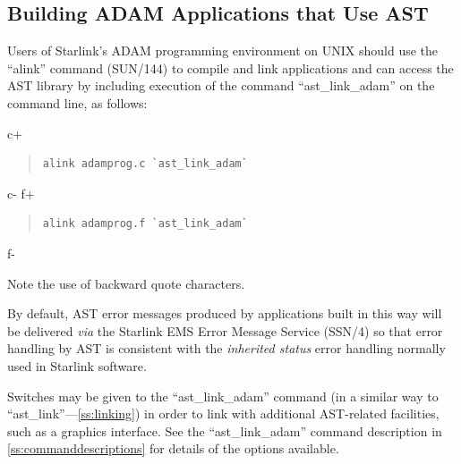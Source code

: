 \documentclass[twoside,11pt]{article}
\newcommand{\xref}[3]{#1}
\newcommand{\appref}[1]{Appendix~\ref{#1}}
\newcommand{\secref}[1]{\S\ref{#1}}
\renewcommand{\appref}[1]{\ref{#1}}
\renewcommand{\secref}[1]{\ref{#1}}
\begin{document}
\subsection{Building ADAM Applications that Use AST}

Users of Starlink's \xref{ADAM}{sg4}{} programming environment
 on UNIX should use the
``\xref{alink}{sun144}{ADAM_link_scripts}'' command
(\xref{SUN/144}{sun144}{}) to compile and link applications and can
access the AST library by including execution of the command
``ast\_link\_adam'' on the command line, as follows:

c+
\begin{quote}
\small
\begin{verbatim}
alink adamprog.c `ast_link_adam`
\end{verbatim}
\normalsize
\end{quote}
c-
f+
\begin{quote}
\small
\begin{verbatim}
alink adamprog.f `ast_link_adam`
\end{verbatim}
\normalsize
\end{quote}
f-

Note the use of backward quote characters.

By default, AST error messages produced by applications built in this
way will be delivered {\em{via}} the Starlink EMS Error Message
Service (\xref{SSN/4}{ssn4}{}) so that error handling by AST is
consistent with the \xref{{\em{inherited
status}}}{sun104}{inherited_status} error handling normally used in
Starlink software.

Switches may be given to the ``ast\_link\_adam'' command (in a similar
way to ``ast\_link''---\secref{ss:linking}) in order to link with
additional AST-related facilities, such as a graphics interface. See
the ``ast\_link\_adam'' command description in
\appref{ss:commanddescriptions} for details of the options available.

\appendix




\end{document}
